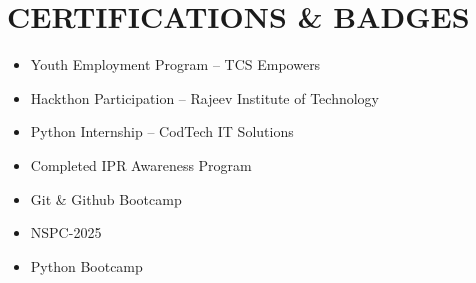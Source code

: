 \documentclass[9.5pt,a4paper]{extarticle}
\begin{document}
\section*{CERTIFICATIONS \& BADGES}
\begin{itemize}[leftmargin=0.2in, itemsep=1pt, topsep=1pt]
    \item Youth Employment Program – TCS Empowers
    \item Hackthon Participation – Rajeev Institute of Technology
    \item Python Internship – CodTech IT Solutions
    \item Completed IPR Awareness Program
    \item Git \& Github Bootcamp
    \item NSPC-2025
    \item Python Bootcamp
\end{itemize}
\end{document}

